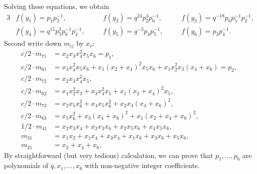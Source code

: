 \documentclass[12pt,a4paper]{article}
\theoremstyle{plain} %
\theoremstyle{definition} %
\theoremstyle{definition} %
\numberwithin{theorem}{section}
\numberwithin{equation}{section}
\numberwithin{figure}{section}
\numberwithin{table}{section}
\begin{document}
Solving these equations, we obtain
\begin{alignat*}{3}
 & f(y_1) =         p_1 p_2^{-1}, \quad &
 & f(y_2) = q^{ 24} p_2^3 p_6^{-1}, \quad &
 & f(y_3) = q^{-18} p_6 p_5^{-1} p_2^{-1}, \\
 & f(y_4) = q^{ 15} p_5^3 p_6^{-1} p_4^{-1}, \quad &
 & f(y_5) = q^{- 3} p_4 p_5^{-1}, \quad &
 & f(y_6) =         p_3 p_4^{-1}. 
\end{alignat*}
Second write down $m_{ij}$ by $x_\nu$:
\begin{align*}
c/2\cdot m_{71}&=x_2x_3x_4^2x_5x_6=p_1, \\
c/2\cdot m_{61}&=x_3x_4^2x_5x_6+x_1(x_2+x_4)^2x_5x_6+x_1x_2^2x_3(x_4+x_6)=p_2, \\
c/2\cdot m_{72}&=x_2x_3x_4^2x_5, \\
c/2\cdot m_{62}&=x_1x_2^2x_3+x_3x_4^2x_5+x_1(x_2+x_4)^2x_5, \\
c/2\cdot m_{73}&=x_2x_5x_6^2+x_4x_5x_6^2+x_2x_3(x_4+x_6)^2, \\
c/2\cdot m_{63}&=x_5x_6^2+x_3(x_4+x_6)^2+x_1(x_2+x_4+x_6)^2, \\
1/2\cdot m_{41}&=x_2x_3x_4+x_2x_3x_6+x_2x_5x_6+x_4x_5x_6, \\
         m_{31}&=x_1x_2+x_1x_4+x_3x_4+x_1x_6+x_3x_6+x_5x_6, \\
         m_{21}&=x_2+x_4+x_6, 
\end{align*}
By straightforward (but very tedious) calculation, we can prove that
$p_1,\ldots,p_6$ are polynomials of $q,x_1,\ldots,x_6$
with non-negative integer coefficients.
\end{document}
